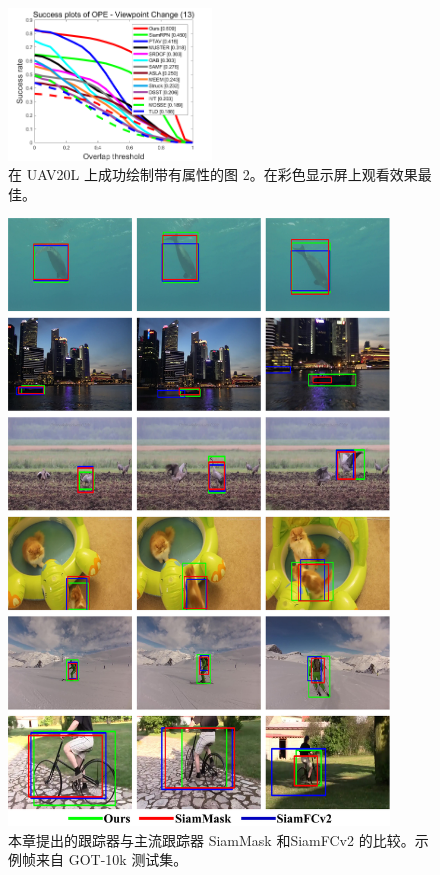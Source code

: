 \begin{figure}[t!]
\begin{center}
	\includegraphics[width=0.48\textwidth]{Img/globally/UAV20L/VC_overlap_OPE_AUC.png}
\end{center}
   \caption{在 UAV20L 上成功绘制带有属性的图 2。在彩色显示屏上观看效果最佳。}
\label{fig:globally_uav20l_2}
\end{figure}

\nopagebreak[3]
\begin{figure}[p!]
    \centering
    \includegraphics[width=0.9\textwidth]{Img/globally/visulization.pdf}
    \caption{本章提出的跟踪器与主流跟踪器 SiamMask \cite{Wang2018SiamMask} 和SiamFCv2\cite{SiamFC} 的比较。示例帧来自 GOT-10k \cite{GOT-10k} 测试集。}
    \label{fig:gloablly_vis}
\end{figure}
\nopagebreak[3]

